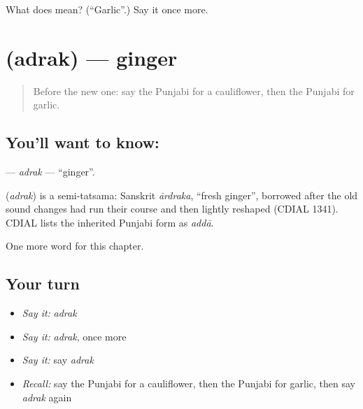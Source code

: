 \begin{tcolorbox}[breakable,colback=teal!4,colframe=teal!35!black,title={Before you move on}]
What does  mean? (\textquotedblleft{}Garlic\textquotedblright{}.) Say it once more.
\end{tcolorbox}
\section[\texorpdfstring{\pa{ਅਦਰਕ} (adrak)}{ਅਦਰਕ (adrak)}]{ (adrak) — ginger}

\label{lesson:PA-C123-adrak}



\begin{quote}
Before the new one: say the Punjabi for a cauliflower, then the Punjabi for garlic.
\end{quote}

\subsection*{You'll want to know: }
\textbf{} — \emph{adrak} — \textquotedblleft{}ginger\textquotedblright{}.

\begin{cousinweb}
\textbf{} (\emph{adrak}) is a semi-tatsama: Sanskrit \emph{ārdraka}, \textquotedblleft{}fresh ginger\textquotedblright{}, borrowed after the old sound changes had run their course and then lightly reshaped (CDIAL 1341). CDIAL lists the inherited Punjabi form as \emph{addā}.
\end{cousinweb}

\begin{grammarlens}[title={What you've built}]
One more word for this chapter.
\end{grammarlens}

\subsection*{Your turn}
\begin{itemize}
\raggedright
  \item \emph{Say it:} \emph{adrak}
  \item \emph{Say it:} \emph{adrak}, once more
  \item \emph{Say it:} say \emph{adrak}
  \item \emph{Recall:} say the Punjabi for a cauliflower, then the Punjabi for garlic, then say \emph{adrak} again
\end{itemize}

